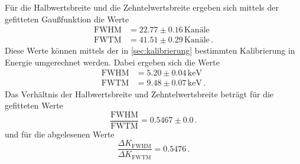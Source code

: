 Für die Halbwertsbreite und die Zehntelwertsbreite ergeben sich mittels der gefitteten Gaußfunktion die Werte
\begin{align*}
  \text{FWHM} &= 22.77 \pm 0.16 \, \text{Kanäle} \\
  \text{FWTM} &= 41.51 \pm 0.29 \, \text{Kanäle} \, .
\end{align*}
Diese Werte können mittels der in \ref{sec:kalibrierung} bestimmten Kalibrierung in Energie umgerechnet werden.
Dabei ergeben sich die Werte
\begin{align*}
  \text{FWHM} &= 5.20 \pm 0.04 \, \si{\kilo\electronvolt} \\
  \text{FWTM} &= 9.48 \pm 0.07 \, \si{\kilo\electronvolt} \, .
\end{align*}
Das Verhältnis der Halbwertsbreite und Zehntelwertsbreite beträgt für die gefitteten Werte
\begin{equation*}
  \frac{\text{FWHM}}{\text{FWTM}} = 0.5467 \pm 0.0 \, .
\end{equation*}
und für die abgelesenen Werte
\begin{equation*}
  \frac{\Delta K_\text{FWHM}}{\Delta K_\text{FWTM}} = 0.5476 \, .
\end{equation*}

